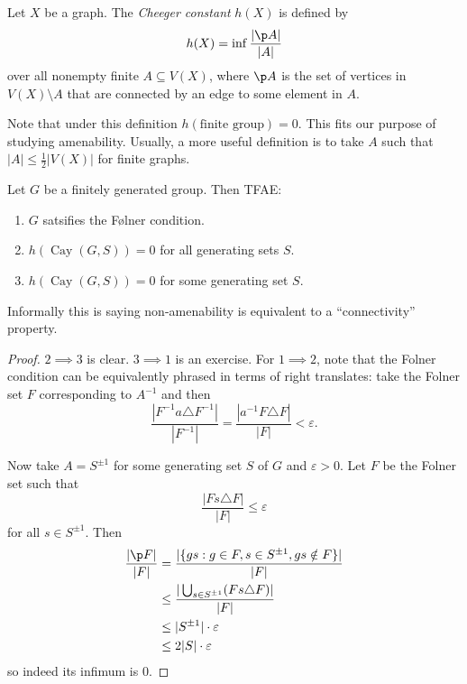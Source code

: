 \documentclass[a4paper]{article}
\DeclareMathOperator{\Cay}{Cay} %
\begin{document}
\begin{definition}
  Let \(X\) be a graph. The \emph{Cheeger constant} \(h(X)\) is defined by
  \[
    h(X) = \inf \frac{|\p A|}{|A|}
  \]
  over all nonempty finite \(A \subseteq V(X)\), where \(\p A\) is the set of vertices in \(V(X) \setminus A\) that are connected by an edge to some element in \(A\).
\end{definition}

Note that under this definition \(h(\text{finite group}) = 0\). This fits our purpose of studying amenability. Usually, a more useful definition is to take \(A\) such that \(|A| \leq \frac{1}{2} |V(X)|\) for finite graphs.

\begin{proposition}
  Let \(G\) be a finitely generated group. Then TFAE:
  \begin{enumerate}
  \item \(G\) satsifies the Følner condition.
  \item \(h(\Cay(G, S)) = 0\) for all generating sets \(S\).
  \item \(h(\Cay(G, S)) = 0\) for some generating set \(S\).
  \end{enumerate}
\end{proposition}

Informally this is saying non-amenability is equivalent to a ``connectivity'' property.

\begin{proof}
  \(2 \implies 3\) is clear. \(3 \implies 1\) is an exercise. For \(1 \implies 2\), note that the Folner condition can be equivalently phrased in terms of right translates: take the Folner set \(F\) corresponding to \(A^{-1}\) and then
  \[
    \frac{|F^{-1}a \triangle F^{-1}|}{|F^{-1}|} = \frac{|a^{-1}F \triangle F|}{|F|} < \varepsilon.
  \]

  Now take \(A = S^{\pm 1}\) for some generating set \(S\) of \(G\) and \(\varepsilon > 0\). Let \(F\) be the Folner set such that
  \[
    \frac{|Fs \triangle F|}{|F|} \leq \varepsilon
  \]
  for all \(s \in S^{\pm 1}\). Then
  \begin{align*}
    \frac{|\p F|}{|F|}
    &= \frac{|\{gs: g \in F, s \in S^{\pm 1}, gs \notin F\}|}{|F|} \\
    &\leq \frac{|\bigcup_{s \in S^{\pm 1}} (Fs \triangle F)|}{|F|} \\
    &\leq |S^{\pm 1}| \cdot \varepsilon \\
    &\leq 2 |S| \cdot \varepsilon
  \end{align*}
  so indeed its infimum is \(0\).
\end{proof}
\end{document}
